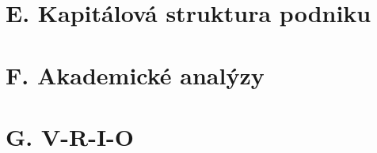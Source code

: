 


\section*{E. Kapitálová struktura podniku}
\label{sec:Kapitalova struktura podniku}

\section*{F. Akademické analýzy}
\label{sec:Akademicke analyzy}

\section*{G. V-R-I-O}
\label{sec:V-R-I-O}
